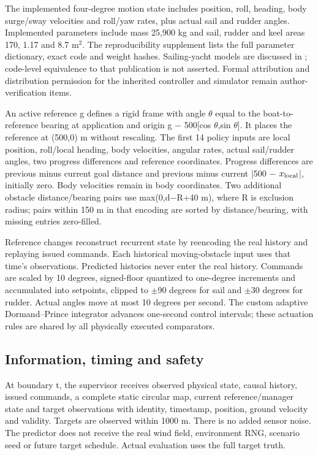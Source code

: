 \documentclass[conference]{IEEEtran}
\begin{document}
The implemented four-degree motion state includes position, roll, heading, body surge/sway velocities and roll/yaw rates, plus actual sail and rudder angles. Implemented parameters include mass 25,900 kg and sail, rudder and keel areas 170, 1.17 and 8.7 m\ensuremath{^2}. The reproducibility supplement lists the full parameter dictionary, exact code and weight hashes. Sailing-yacht models are discussed in \cite{ref8}; code-level equivalence to that publication is not asserted. Formal attribution and distribution permission for the inherited controller and simulator remain author-verification items.

An active reference g defines a rigid frame with angle \ensuremath{\theta} equal to the boat-to-reference bearing at application and origin g \ensuremath{-} 500[cos \ensuremath{\theta},sin \ensuremath{\theta}]. It places the reference at (500,0) m without rescaling. The first 14 policy inputs are local position, roll/local heading, body velocities, angular rates, actual sail/rudder angles, two progress differences and reference coordinates. Progress differences are previous minus current goal distance and previous minus current |500 \ensuremath{-} $x_{\rm local}$|, initially zero. Body velocities remain in body coordinates. Two additional obstacle distance/bearing pairs use max(0,d\ensuremath{-}R+40 m), where R is exclusion radius; pairs within 150 m in that encoding are sorted by distance/bearing, with missing entries zero-filled.

Reference changes reconstruct recurrent state by reencoding the real history and replaying issued commands. Each historical moving-obstacle input uses that time's observations. Predicted histories never enter the real history. Commands are scaled by 10 degrees, signed-floor quantized to one-degree increments and accumulated into setpoints, clipped to \ensuremath{\pm}90 degrees for sail and \ensuremath{\pm}30 degrees for rudder. Actual angles move at most 10 degrees per second. The custom adaptive Dormand--Prince integrator advances one-second control intervals; these actuation rules are shared by all physically executed comparators.

\subsection{Information, timing and safety}

At boundary t, the supervisor receives observed physical state, causal history, issued commands, a complete static circular map, current reference/manager state and target observations with identity, timestamp, position, ground velocity and validity. Targets are observed within 1000 m. There is no added sensor noise. The predictor does not receive the real wind field, environment RNG, scenario seed or future target schedule. Actual evaluation uses the full target truth.
\end{document}
